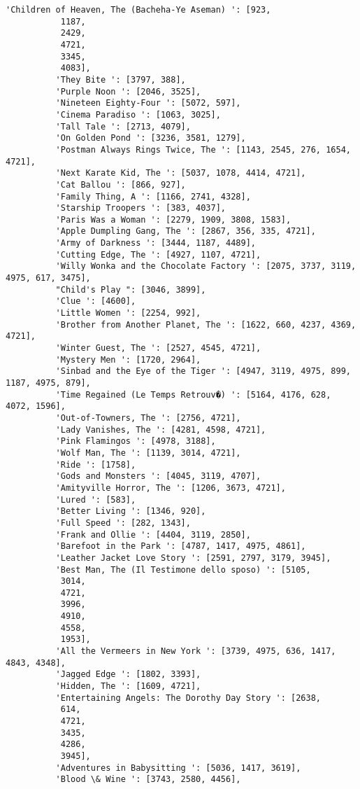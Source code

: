 \documentclass[11pt]{article}
\begin{document}
\begin{Verbatim}[commandchars=\\\{\}]
          'Children of Heaven, The (Bacheha-Ye Aseman) ': [923,
           1187,
           2429,
           4721,
           3345,
           4083],
          'They Bite ': [3797, 388],
          'Purple Noon ': [2046, 3525],
          'Nineteen Eighty-Four ': [5072, 597],
          'Cinema Paradiso ': [1063, 3025],
          'Tall Tale ': [2713, 4079],
          'On Golden Pond ': [3236, 3581, 1279],
          'Postman Always Rings Twice, The ': [1143, 2545, 276, 1654, 4721],
          'Next Karate Kid, The ': [5037, 1078, 4414, 4721],
          'Cat Ballou ': [866, 927],
          'Family Thing, A ': [1166, 2741, 4328],
          'Starship Troopers ': [383, 4037],
          'Paris Was a Woman ': [2279, 1909, 3808, 1583],
          'Apple Dumpling Gang, The ': [2867, 356, 335, 4721],
          'Army of Darkness ': [3444, 1187, 4489],
          'Cutting Edge, The ': [4927, 1107, 4721],
          'Willy Wonka and the Chocolate Factory ': [2075, 3737, 3119, 4975, 617, 3475],
          "Child's Play ": [3046, 3899],
          'Clue ': [4600],
          'Little Women ': [2254, 992],
          'Brother from Another Planet, The ': [1622, 660, 4237, 4369, 4721],
          'Winter Guest, The ': [2527, 4545, 4721],
          'Mystery Men ': [1720, 2964],
          'Sinbad and the Eye of the Tiger ': [4947, 3119, 4975, 899, 1187, 4975, 879],
          'Time Regained (Le Temps Retrouv�) ': [5164, 4176, 628, 4072, 1596],
          'Out-of-Towners, The ': [2756, 4721],
          'Lady Vanishes, The ': [4281, 4598, 4721],
          'Pink Flamingos ': [4978, 3188],
          'Wolf Man, The ': [1139, 3014, 4721],
          'Ride ': [1758],
          'Gods and Monsters ': [4045, 3119, 4707],
          'Amityville Horror, The ': [1206, 3673, 4721],
          'Lured ': [583],
          'Better Living ': [1346, 920],
          'Full Speed ': [282, 1343],
          'Frank and Ollie ': [4404, 3119, 2850],
          'Barefoot in the Park ': [4787, 1417, 4975, 4861],
          'Leather Jacket Love Story ': [2591, 2797, 3179, 3945],
          'Best Man, The (Il Testimone dello sposo) ': [5105,
           3014,
           4721,
           3996,
           4910,
           4558,
           1953],
          'All the Vermeers in New York ': [3739, 4975, 636, 1417, 4843, 4348],
          'Jagged Edge ': [1802, 3393],
          'Hidden, The ': [1609, 4721],
          'Entertaining Angels: The Dorothy Day Story ': [2638,
           614,
           4721,
           3435,
           4286,
           3945],
          'Adventures in Babysitting ': [5036, 1417, 3619],
          'Blood \& Wine ': [3743, 2580, 4456],

\end{Verbatim}
\end{document}

